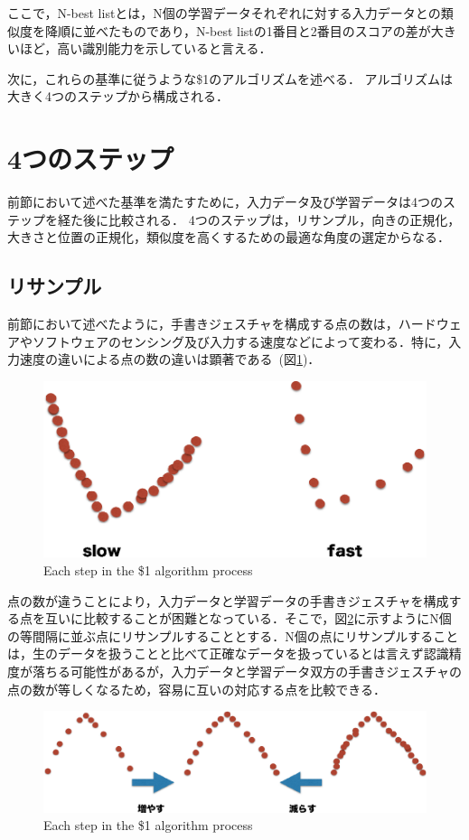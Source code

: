 ここで，N-best listとは，N個の学習データそれぞれに対する入力データとの類似度を降順に並べたものであり，N-best listの1番目と2番目のスコアの差が大きいほど，高い識別能力を示していると言える．

次に，これらの基準に従うような\$1のアルゴリズムを述べる．
アルゴリズムは大きく4つのステップから構成される．


\section{4つのステップ}
前節において述べた基準を満たすために，入力データ及び学習データは4つのステップを経た後に比較される．
4つのステップは，リサンプル，向きの正規化，大きさと位置の正規化，類似度を高くするための最適な角度の選定からなる．

\subsection{リサンプル}
前節において述べたように，手書きジェスチャを構成する点の数は，ハードウェアやソフトウェアのセンシング及び入力する速度などによって変わる．特に，入力速度の違いによる点の数の違いは顕著である~(図\ref{fig:strokes})．

\begin{figure} [!h]
\centering
\includegraphics [width=0.8\columnwidth]{img/strokes.eps}
\caption{Each step in the \$1 algorithm process}
\label{fig:strokes}
\end{figure}

点の数が違うことにより，入力データと学習データの手書きジェスチャを構成する点を互いに比較することが困難となっている．そこで，図\ref{fig:resample}に示すようにN個の等間隔に並ぶ点にリサンプルすることとする．N個の点にリサンプルすることは，生のデータを扱うことと比べて正確なデータを扱っているとは言えず認識精度が落ちる可能性があるが，入力データと学習データ双方の手書きジェスチャの点の数が等しくなるため，容易に互いの対応する点を比較できる．

\begin{figure} [!h]
\centering
\includegraphics [width=0.8\columnwidth]{img/resample.eps}
\caption{Each step in the \$1 algorithm process}
\label{fig:resample}
\end{figure}

